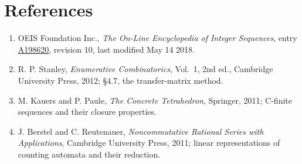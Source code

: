 \documentclass[11pt]{article}
\theoremstyle{definition}
\begin{document}
\section{References}

\begin{enumerate}

\item OEIS Foundation Inc., \emph{The On-Line Encyclopedia of Integer Sequences}, entry \href{https://oeis.org/A198620}{A198620}, revision 10, last modified May 14 2018.

\item R. P. Stanley, \emph{Enumerative Combinatorics}, Vol.~1, 2nd ed., Cambridge University Press, 2012; \S4.7, the transfer-matrix method.

\item M. Kauers and P. Paule, \emph{The Concrete Tetrahedron}, Springer, 2011; C-finite sequences and their closure properties.

\item J. Berstel and C. Reutenauer, \emph{Noncommutative Rational Series with Applications}, Cambridge University Press, 2011; linear representations of counting automata and their reduction.

\end{enumerate}
\end{document}
